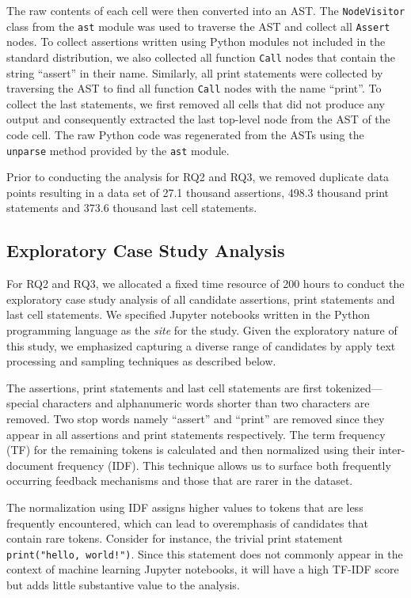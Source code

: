 \documentclass[journal]{IEEEtran}       %
\begin{document}
The raw contents of each cell were then converted into an AST. The
\lstinline{NodeVisitor} class from the \lstinline{ast} module was
used to traverse the AST and collect all \lstinline{Assert} nodes. To
collect assertions written using Python modules not included in the
standard distribution, we also collected all function
\lstinline{Call} nodes that contain the string ``assert'' in their
name. Similarly, all print statements were collected by traversing
the AST to find all function \lstinline{Call} nodes with the name
``print''. To collect the last statements, we first removed all cells
that did not produce any output and consequently extracted the last
top-level node from the AST of the code cell. The raw Python code was
regenerated from the ASTs using the \lstinline{unparse} method
provided by the \lstinline{ast} module.

Prior to conducting the analysis for RQ2 and RQ3, we removed
duplicate data points resulting in a data set of 27.1 thousand
assertions, 498.3 thousand print statements and 373.6 thousand last
cell statements.

\subsection{Exploratory Case Study Analysis}

For RQ2 and RQ3, we allocated a fixed time resource of 200 hours to
conduct the exploratory case study analysis of all candidate
assertions, print statements and last cell statements. We specified
Jupyter notebooks written in the Python programming language as the
\emph{site} for the study. Given the exploratory nature of this
study, we emphasized capturing a diverse range of candidates by apply
text processing and sampling techniques as described below.

The assertions, print statements and last cell statements are first
tokenized---special characters and alphanumeric words shorter than
two characters are removed. Two stop words namely ``assert'' and
``print'' are removed since they appear in all assertions and print
statements respectively. The term frequency (TF) for the remaining
tokens is calculated and then normalized using their inter-document
frequency (IDF). This technique allows us to surface both frequently
occurring feedback mechanisms and those that are rarer in the dataset.

The normalization using IDF assigns higher values to tokens that are
less frequently encountered, which can lead to overemphasis of
candidates that contain rare tokens. Consider for instance, the
trivial print statement \lstinline{print("hello, world!")}. Since
this statement does not commonly appear in the context of machine
learning Jupyter notebooks, it will have a high TF-IDF score but adds
little substantive value to the analysis.
\end{document}
